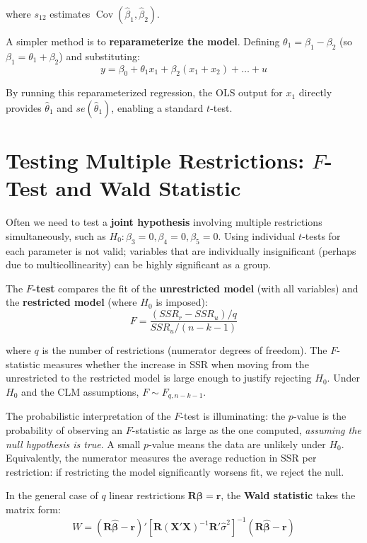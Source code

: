 where $s_{12}$ estimates $\operatorname{Cov}(\hat{\beta}_1, \hat{\beta}_2)$.

A simpler method is to \textbf{reparameterize the model}. Defining $\theta_1 = \beta_1 - \beta_2$ (so $\beta_1 = \theta_1 + \beta_2$) and substituting:
$$y = \beta_0 + \theta_1 x_1 + \beta_2(x_1 + x_2) + \ldots + u$$

By running this reparameterized regression, the OLS output for $x_1$ directly provides $\hat{\theta}_1$ and $se(\hat{\theta}_1)$, enabling a standard $t$-test.

\section[Testing Multiple Restrictions: F-Test and Wald Statistic]
{Testing Multiple Restrictions: \texorpdfstring{$F$}{F}-Test and Wald Statistic}

Often we need to test a \textbf{joint hypothesis} involving multiple restrictions simultaneously, such as $H_0: \beta_3 = 0, \beta_4 = 0, \beta_5 = 0$. Using individual $t$-tests for each parameter is not valid; variables that are individually insignificant (perhaps due to multicollinearity) can be highly significant as a group.

The \textbf{$F$-test} compares the fit of the \textbf{unrestricted model} (with all variables) and the \textbf{restricted model} (where $H_0$ is imposed):
$$F = \frac{(SSR_r - SSR_u)/q}{SSR_u/(n - k - 1)}$$

where $q$ is the number of restrictions (numerator degrees of freedom). The $F$-statistic measures whether the increase in SSR when moving from the unrestricted to the restricted model is large enough to justify rejecting $H_0$. Under $H_0$ and the CLM assumptions, $F \sim F_{q, n-k-1}$.

The probabilistic interpretation of the $F$-test is illuminating: the $p$-value is the probability of observing an $F$-statistic as large as the one computed, \emph{assuming the null hypothesis is true}. A small $p$-value means the data are unlikely under $H_0$. Equivalently, the numerator measures the average reduction in SSR per restriction: if restricting the model significantly worsens fit, we reject the null.

In the general case of $q$ linear restrictions $\mathbf{R}\boldsymbol{\beta} = \mathbf{r}$, the \textbf{Wald statistic} takes the matrix form:
$$W = (\mathbf{R}\hat{\boldsymbol{\beta}} - \mathbf{r})'\left[\mathbf{R}(\mathbf{X}'\mathbf{X})^{-1}\mathbf{R}'\hat{\sigma}^2\right]^{-1}(\mathbf{R}\hat{\boldsymbol{\beta}} - \mathbf{r})$$

